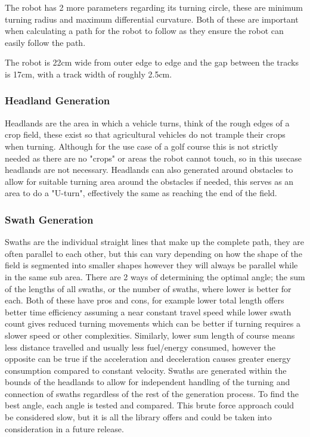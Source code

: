 \documentclass[final]{cmpreport_02}
\begin{document}
The robot has 2 more parameters regarding its turning circle, these are minimum turning radius and maximum differential curvature.
Both of these are important when calculating a path for the robot to follow as they ensure the robot can easily follow the path.

The robot is 22cm wide from outer edge to edge and the gap between the tracks is 17cm, with a track width of roughly 2.5cm.


\subsubsection{Headland Generation}
Headlands are the area in which a vehicle turns, think of the rough edges of a crop field, these exist so that agricultural vehicles do not trample their crops when turning.
Although for the use case of a golf course this is not strictly needed as there are no "crops" or areas the robot cannot touch, so in this usecase headlands are not necessary.
Headlands can also generated around obstacles to allow for suitable turning area around the obstacles if needed, this serves as an area to do a "U-turn", effectively the same as reaching the end of the field.


\subsubsection{Swath Generation}
Swaths are the individual straight lines that make up the complete path,
they are often parallel to each other, but this can vary depending on how the shape of the field is segmented into smaller shapes however they will always be parallel while in the same sub area.
There are 2 ways of determining the optimal angle; the sum of the lengths of all swaths, or the number of swaths, where lower is better for each.
Both of these have pros and cons, for example lower total length offers better time efficiency assuming a near constant travel speed while lower swath count gives reduced turning movements which can be better if turning requires a slower speed or other complexities.
Similarly, lower sum length of course means less distance travelled and usually less fuel/energy consumed, however the opposite can be true if the acceleration and deceleration causes greater energy consumption compared to constant velocity.
Swaths are generated within the bounds of the headlands to allow for independent handling of the turning and connection of swaths regardless of the rest of the generation process.
To find the best angle, each angle is tested and compared. This brute force approach could be considered slow, but it is all the library offers and could be taken into consideration in a future release.
\end{document}
